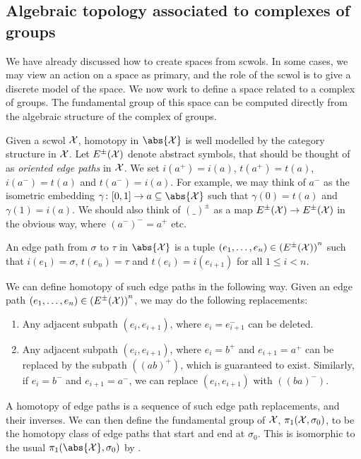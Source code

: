 \subsection{Algebraic topology associated to complexes of groups}
We have already discussed how to create spaces from scwols.
In some cases, we may view an action on a space as primary, and the role of the scwol is to give a discrete model of the space.
We now work to define a space related to a complex of groups.
The fundamental group of this space can be computed directly from the algebraic structure of the complex of groups.

Given a scwol $\mathcal{X}$, homotopy in $\abs{\calx}$ is well modelled by the category structure in $\mathcal{X}$.
Let  $E^{\pm}(\mathcal{X})$ denote abstract symbols, that should be thought of as \emph{oriented edge paths} in $\mathcal{X}$.
We set $i(a^+) = i(a)$, $t(a^+) = t(a)$, $i(a^-) = t(a)$ and $t(a^-)= i(a)$.
For example, we may think of $a^-$ as the isometric embedding $\gamma \colon [0,1] \to a \subseteq \abs{\calx}$ such that  $\gamma(0) = t(a)$ and $\gamma(1) = i(a)$.
We should also think of $(\_)^\pm$ as a map $E^\pm(\mathcal{X}) \to E^\pm(\mathcal{X})$ in the obvious way, where  $(a^-)^-= a^+$ etc.
\begin{definition}
	An edge path from $\sigma$ to  $\tau$ in $\abs{\calx}$ is a tuple $(e_1, \ldots, e_n) \in \left(E^\pm(\mathcal{X})\right)^n$ such that $i(e_1)=\sigma$,  $t(e_n)=\tau$ and  $t(e_i) = i(e_{i+1})$ for all  $1 \leq i < n$.
	\label{def:edge_path_in_scwol}
\end{definition}
We can define homotopy of such edge paths in the following way.
Given an edge path $(e_1, \ldots, e_n) \in \left(E^\pm(\mathcal{X})\right)^n$, we may do the following replacements:
\begin{enumerate}
	\item Any adjacent subpath $(e_i,e_{i+1})$, where $e_i=e_{i+1}^-$ can be deleted.
	\item Any adjacent subpath $(e_i,e_{i+1})$, where $e_i = b^+$ and  $e_{i+1}=a^+$ can be replaced by the subpath $((ab)^+)$, which is guaranteed to exist.
	Similarly, if $e_i = b^-$ and  $e_{i+1}=a^-$, we can replace $(e_i,e_{i+1})$ with  $((ba)^-)$.
\end{enumerate}
A homotopy of edge paths is a sequence of such edge path replacements, and their inverses.
We can then define the fundamental group of $\mathcal{X}$,  $\pi_1(\mathcal{X},\sigma_0)$, to be the homotopy class of edge paths that start and end at  $\sigma_0$.
This is isomorphic to the usual $\pi_1(\abs{\calx}, \sigma_0)$ by \cite[Corollary 4.12]{hatcher_algebraic_2001}.

